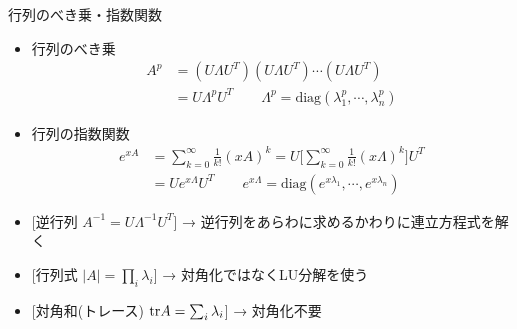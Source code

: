 \begin{frame}[t,fragile]{行列のべき乗・指数関数}
  \begin{itemize}
  \item 行列のべき乗
    \begin{align*}
      A^p &= (U \Lambda U^T)(U \Lambda U^T) \cdots (U \Lambda U^T) \\
      &= U \Lambda^p U^T \qquad \Lambda^p = \text{diag}(\lambda_1^p,\cdots,\lambda_n^p)
    \end{align*}
  \item 行列の指数関数
    \begin{align*}
      e^{xA} &= \sum_{k=0}^{\infty} \frac{1}{k!}(xA)^k = U \Big[ \sum_{k=0}^{\infty} \frac{1}{k!}(x\Lambda)^k \Big] U^T \\
      &= U e^{x \Lambda} U^T \qquad e^{x \Lambda} = \text{diag}(e^{x\lambda_1},\cdots,e^{x\lambda_n})
    \end{align*}
  \item \mbox{} [逆行列 $A^{-1} = U \Lambda^{-1} U^T$] → 逆行列をあらわに求めるかわりに連立方程式を解く
  \item \mbox{} [行列式 $|A| = \prod_i \lambda_i$] → 対角化ではなくLU分解を使う
  \item \mbox{} [対角和(トレース) ${\rm tr} A = \sum_i \lambda_i$] → 対角化不要
  \end{itemize}
\end{frame}
